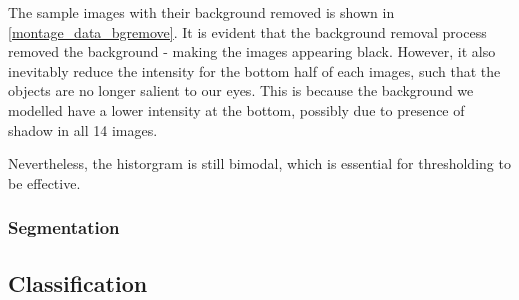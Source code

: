 \documentclass[main.tex]{subfiles}
\begin{document}
The sample images with their background removed is shown in \autoref{montage_data_bgremove}. It is evident that the background removal process removed the background - making the images appearing black. However, it also inevitably reduce the intensity for the bottom half of each images, such that the objects are no longer salient to our eyes. This is because the background we modelled have a lower intensity at the bottom, possibly due to presence of shadow in all 14 images.

Nevertheless, the historgram  is still bimodal, which is essential for thresholding to be effective.

\subsubsection*{Segmentation}



\subsection{Classification}
\end{document}
